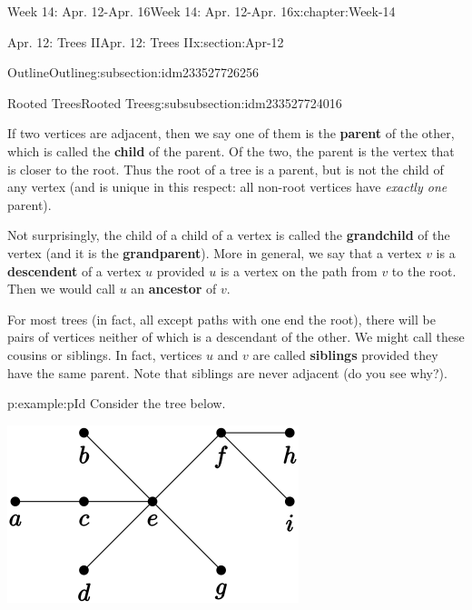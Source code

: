 \documentclass[oneside,10pt,]{book}
\newcommand{\terminology}[1]{\textbf{#1}}
\numberwithin{equation}{section}
\begin{document}
\begin{chapterptx}{Week 14: Apr. 12-Apr. 16}{}{Week 14: Apr. 12-Apr. 16}{}{}{x:chapter:Week-14}
\begin{sectionptx}{Apr. 12: Trees II}{}{Apr. 12: Trees II}{}{}{x:section:Apr-12}
\begin{subsectionptx}{Outline}{}{Outline}{}{}{g:subsection:idm233527726256}
\begin{subsubsectionptx}{Rooted Trees}{}{Rooted Trees}{}{}{g:subsubsection:idm233527724016}
\par
{} If two vertices are adjacent, then we say one of them is the \terminology{parent} of the other, which is called the \terminology{child} of the parent.  Of the two, the parent is the vertex that is closer to the root.  Thus the root of a tree is a parent, but is not the child of any vertex (and is unique in this respect: all non-root vertices have \emph{exactly one} parent).%
\par
{} Not surprisingly, the child of a child of a vertex is called the \terminology{grandchild} of the vertex (and it is the \terminology{grandparent}).  More in general, we say that a vertex \(v\) is a \terminology{descendent} of a vertex \(u\) provided \(u\) is a vertex on the path from \(v\) to the root.  Then we would call \(u\) an \terminology{ancestor} of \(v\).%
\par
{} For most trees (in fact, all except paths with one end the root), there will be pairs of vertices neither of which is a descendant of the other.  We might call these cousins or siblings.  In fact, vertices \(u\) and \(v\) are called \terminology{siblings} provided they have the same parent.  Note that siblings are never adjacent (do you see why?).%
\begin{example}{}{p:example:pId}%
Consider the tree below.%
\begin{sidebyside}{1}{0.325}{0.325}{0}%
\begin{sbspanel}{0.35}%
\includegraphics[width=\linewidth]{./img/img-labeled-tree.svg}
\end{sbspanel}%
\end{sidebyside}%
\par

\end{example}
\end{subsubsectionptx}
\end{subsectionptx}
\end{sectionptx}
\end{chapterptx}
\end{document}
